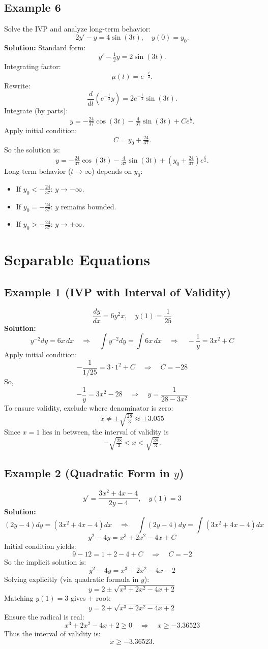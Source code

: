 \documentclass[12pt]{book}
\begin{document}
\subsection*{Example 6}
Solve the IVP and analyze long-term behavior:
\[
2y' - y = 4\sin(3t), \quad y(0) = y_0.
\]
\textbf{Solution:}
Standard form:
\[
y' - \tfrac12 y = 2\sin(3t).
\]
Integrating factor:
\[
\mu(t) = e^{-\tfrac{t}{2}}.
\]
Rewrite:
\[
\frac{d}{dt}(e^{-\tfrac{t}{2}} y) = 2e^{-\tfrac{t}{2}} \sin(3t).
\]
Integrate (by parts):
\[
y = -\tfrac{24}{37}\cos(3t) - \tfrac{4}{37}\sin(3t) + C e^{\tfrac{t}{2}}.
\]
Apply initial condition:
\[
C = y_0 + \tfrac{24}{37}.
\]
So the solution is:
\[
y = -\tfrac{24}{37}\cos(3t) - \tfrac{4}{37}\sin(3t) + \left(y_0 + \tfrac{24}{37}\right)e^{\tfrac{t}{2}}.
\]
Long-term behavior (\(t \to \infty\)) depends on \(y_0\):
\begin{itemize}
  \item If \(y_0 < -\tfrac{24}{37}\): \(y \to -\infty\).
  \item If \(y_0 = -\tfrac{24}{37}\): \(y\) remains bounded.
  \item If \(y_0 > -\tfrac{24}{37}\): \(y \to +\infty\).
\end{itemize}


\section{Separable Equations}

\subsection*{Example 1 (IVP with Interval of Validity)}
\[
\frac{dy}{dx} = 6y^2x,\quad y(1) = \frac{1}{25}
\]
\textbf{Solution:}
\[
y^{-2}dy = 6x\,dx \quad\Longrightarrow\quad \int y^{-2}dy = \int 6x\,dx \quad\Longrightarrow\quad -\frac{1}{y} = 3x^2 + C
\]
Apply initial condition:
\[
-\frac{1}{1/25} = 3\cdot1^2 + C \quad\Rightarrow\quad C = -28
\]
So,
\[
- \frac{1}{y} = 3x^2 - 28 \quad\Longrightarrow\quad y = \frac{1}{28 - 3x^2}
\]
To ensure validity, exclude where denominator is zero:
\[
x \neq \pm \sqrt{\tfrac{28}{3}} \approx \pm 3.055
\]
Since \(x = 1\) lies in between, the interval of validity is
\[
-\sqrt{\tfrac{28}{3}} < x < \sqrt{\tfrac{28}{3}}.
\]

\subsection*{Example 2 (Quadratic Form in \(y\))}
\[
y' = \frac{3x^2 + 4x - 4}{2y - 4},\quad y(1) = 3
\]
\textbf{Solution:}
\[
(2y - 4)dy = (3x^2 + 4x - 4)dx \quad\Longrightarrow\quad \int (2y - 4)dy = \int (3x^2 + 4x - 4)dx
\]
\[
y^2 - 4y = x^3 + 2x^2 - 4x + C
\]
Initial condition yields:
\[
9 - 12 = 1 + 2 - 4 + C \quad\Rightarrow\quad C = -2
\]
So the implicit solution is:
\[
y^2 - 4y = x^3 + 2x^2 - 4x - 2
\]
Solving explicitly (via quadratic formula in \(y\)):
\[
y = 2 \pm \sqrt{x^3 + 2x^2 - 4x + 2}
\]
Matching \(y(1) = 3\) gives \(+\) root:
\[
y = 2 + \sqrt{x^3 + 2x^2 - 4x + 2}
\]
Ensure the radical is real:
\[
x^3 + 2x^2 - 4x + 2 \ge 0 \quad\Rightarrow\quad x \ge -3.36523
\]
Thus the interval of validity is:
\[
x \ge -3.36523.
\]
\end{document}
